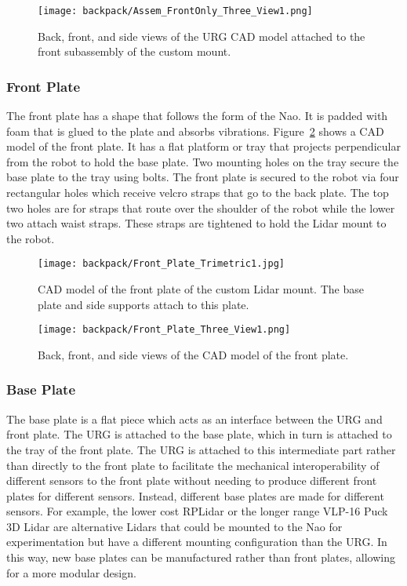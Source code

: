 \begin{figure}[H]
\centering
\texttt{[image: backpack/Assem\_FrontOnly\_Three\_View1.png]}
\caption{Back, front, and side views of the URG CAD model
         attached to the front subassembly of the custom mount.}
\label{fig:nao_lidar_mount_three_view1}
\end{figure}

\FloatBarrier

\subsubsection{Front Plate}
The front plate has a shape that follows the form of the Nao.
It is padded with foam that is glued to the plate and absorbs vibrations.
Figure~\ref{fig:nao_lidar_mount_frontplate_trimetric1} shows a CAD model of the
front plate. It has a flat platform or tray that projects perpendicular from the 
robot to hold the base plate. 
Two mounting holes on the tray secure the base plate to the tray using bolts.
The front plate is secured to the robot via four rectangular holes which receive
velcro straps that go to the back plate. 
The top two holes are for straps that route over the shoulder of the robot while
the lower two attach waist straps.
These straps are tightened to hold the Lidar mount to the robot.

\begin{figure}
\centering
\texttt{[image: backpack/Front\_Plate\_Trimetric1.jpg]}
\caption{CAD model of the front plate of the custom Lidar
         mount. The base plate and side supports attach to this plate.}
\label{fig:nao_lidar_mount_frontplate_trimetric1}
\end{figure}

\begin{figure}
\centering
\texttt{[image: backpack/Front\_Plate\_Three\_View1.png]}
\caption{Back, front, and side views of the CAD model of the
         front plate.}
\label{fig:nao_lidar_mount_frontplate_three_view1}
\end{figure}


\subsubsection{Base Plate}
The base plate is a flat piece which acts as an interface between
the URG and front plate.
The URG is attached to the base plate, which in turn is attached to the 
tray of the front plate. The URG is attached to this intermediate part
rather than directly to the front plate to facilitate the mechanical
interoperability of different sensors to the front plate without needing
to produce different front plates for different sensors. Instead, different
base plates are made for different sensors. For example, the lower cost
RPLidar \cite{rp_lidar} or the longer range VLP-16 Puck 3D Lidar
\cite{puck_lidar} are alternative Lidars that could
be mounted to the Nao for experimentation but have a different mounting 
configuration than the URG\@. In this way, new base plates can be manufactured
rather than front plates, allowing for a more modular design.


